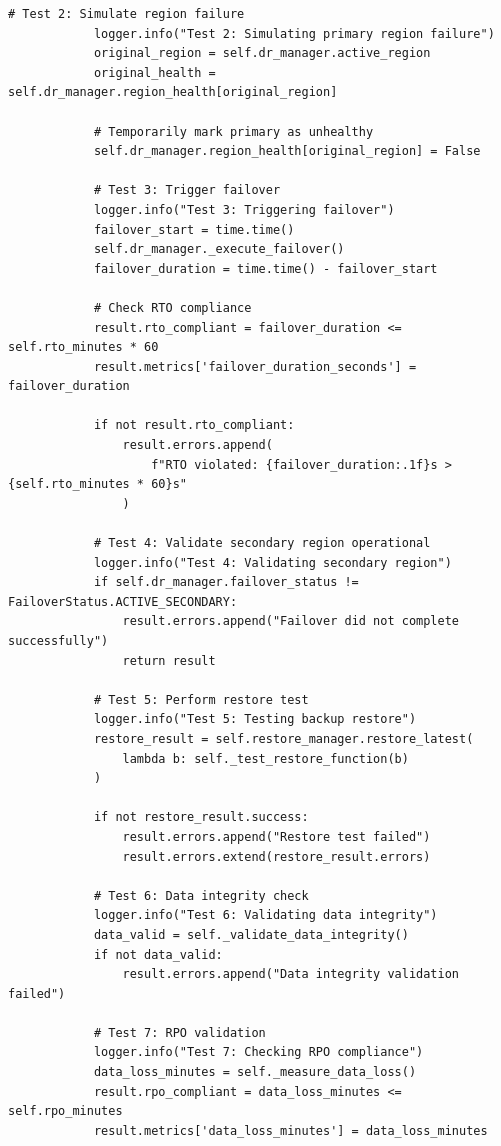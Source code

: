 \begin{lstlisting}[style=python, caption={Disaster Recovery Testing Framework}]
            # Test 2: Simulate region failure
            logger.info("Test 2: Simulating primary region failure")
            original_region = self.dr_manager.active_region
            original_health = self.dr_manager.region_health[original_region]

            # Temporarily mark primary as unhealthy
            self.dr_manager.region_health[original_region] = False

            # Test 3: Trigger failover
            logger.info("Test 3: Triggering failover")
            failover_start = time.time()
            self.dr_manager._execute_failover()
            failover_duration = time.time() - failover_start

            # Check RTO compliance
            result.rto_compliant = failover_duration <= self.rto_minutes * 60
            result.metrics['failover_duration_seconds'] = failover_duration

            if not result.rto_compliant:
                result.errors.append(
                    f"RTO violated: {failover_duration:.1f}s > {self.rto_minutes * 60}s"
                )

            # Test 4: Validate secondary region operational
            logger.info("Test 4: Validating secondary region")
            if self.dr_manager.failover_status != FailoverStatus.ACTIVE_SECONDARY:
                result.errors.append("Failover did not complete successfully")
                return result

            # Test 5: Perform restore test
            logger.info("Test 5: Testing backup restore")
            restore_result = self.restore_manager.restore_latest(
                lambda b: self._test_restore_function(b)
            )

            if not restore_result.success:
                result.errors.append("Restore test failed")
                result.errors.extend(restore_result.errors)

            # Test 6: Data integrity check
            logger.info("Test 6: Validating data integrity")
            data_valid = self._validate_data_integrity()
            if not data_valid:
                result.errors.append("Data integrity validation failed")

            # Test 7: RPO validation
            logger.info("Test 7: Checking RPO compliance")
            data_loss_minutes = self._measure_data_loss()
            result.rpo_compliant = data_loss_minutes <= self.rpo_minutes
            result.metrics['data_loss_minutes'] = data_loss_minutes


\end{lstlisting}
